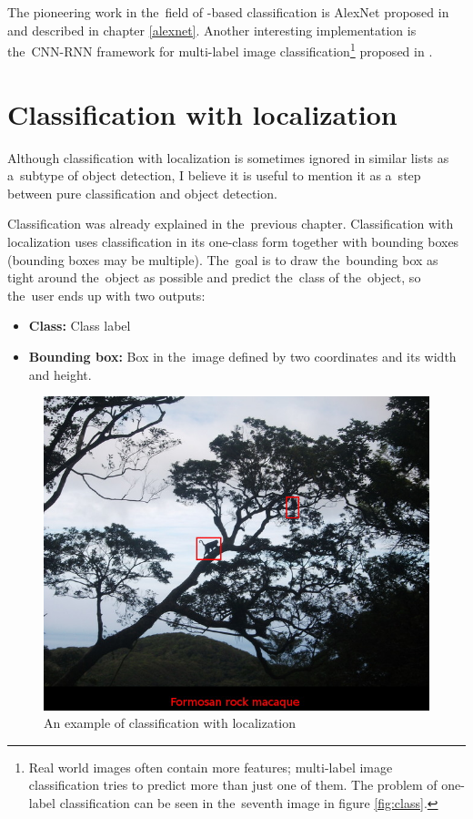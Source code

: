 The pioneering work in the~field of -based classification is AlexNet 
proposed in \cite{cnn-classification} and described in chapter \ref{alexnet}. 
Another interesting implementation is the~CNN-RNN framework for multi-label 
image classification\footnote{Real world images often contain more features; 
multi-label image classification tries to predict more than just one of them. 
The problem of one-label classification can be seen in the~seventh image in 
figure \ref{fig:class}.} proposed in \cite{multi-classification}.

\section{Classification with localization}
\label{classification-localization}

Although classification with localization is sometimes ignored in similar lists 
as a~subtype of object detection, I believe it is useful to mention it as a~step 
between pure classification and object detection.

Classification was already explained in the~previous chapter. Classification 
with localization uses classification in its one-class form together with 
bounding boxes (bounding boxes may be multiple). The~goal is to draw
the~bounding box as tight around the~object as possible and predict the~class of
the~object, so the~user ends up with two outputs:
\begin{itemize}
	\item \textbf{Class:} Class label
	\item \textbf{Bounding box:} Box in the~image defined by two coordinates and
	its width and height.
\end{itemize}

\begin{figure}[H]
   \centering
   \includegraphics[width=.7\linewidth]{./pictures/class-loc.JPG}
	\caption[Classification with localization example]{An example of classification 
	with localization}
      \label{fig:class-loc}
\end{figure}


